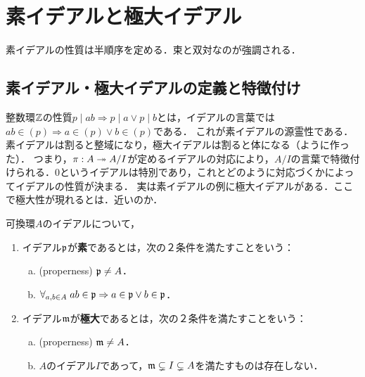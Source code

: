 \documentclass[uplatex,dvipdfmx]{jsreport}
\begin{document}
\section{素イデアルと極大イデアル}

\begin{tcolorbox}[colframe=ForestGreen, colback=ForestGreen!10!white,breakable,colbacktitle=ForestGreen!40!white,coltitle=black,fonttitle=\bfseries\sffamily,
title=]
    素イデアルの性質は半順序を定める．束と双対なのが強調される．
\end{tcolorbox}

\subsection{素イデアル・極大イデアルの定義と特徴付け}

\begin{tcolorbox}[colframe=ForestGreen, colback=ForestGreen!10!white,breakable,colbacktitle=ForestGreen!40!white,coltitle=black,fonttitle=\bfseries\sffamily,
title=]
    整数環$\mathbb{Z}$の性質$p\mid ab\Rightarrow p\mid a\lor p\mid b$とは，イデアルの言葉では$ab\in (p)\Rightarrow a\in(p)\lor b\in(p)$である．
    これが素イデアルの源霊性である．
    素イデアルは割ると整域になり，極大イデアルは割ると体になる（ように作った）．
    つまり，$\pi:A\twoheadrightarrow A/I$が定めるイデアルの対応により，$A/I$の言葉で特徴付けられる．$0$というイデアルは特別であり，これとどのように対応づくかによってイデアルの性質が決まる．
    実は素イデアルの例に極大イデアルがある．ここで極大性が現れるとは．近いのか．
\end{tcolorbox}

\begin{definition}
    可換環$A$のイデアルについて，
    \begin{enumerate}
        \item イデアル$\mathfrak{p}$が\textbf{素}であるとは，次の２条件を満たすことをいう：
        \begin{enumerate}[(a)]
            \item (properness) $\mathfrak{p}\ne A$．
            \item $\forall_{a,b\in A}\;ab\in\mathfrak{p}\Rightarrow a\in\mathfrak{p}\lor b\in\mathfrak{p}$．
        \end{enumerate}
        \item イデアル$\mathfrak{m}$が\textbf{極大}であるとは，次の２条件を満たすことをいう：
        \begin{enumerate}[(a)]
            \item (properness) $\mathfrak{m}\ne A$．
            \item $A$のイデアル$I$であって，$\mathfrak{m}\subsetneq I\subsetneq A$を満たすものは存在しない．
        \end{enumerate}
    \end{enumerate}
\end{definition}
\end{document}

